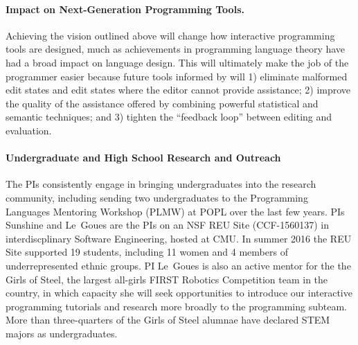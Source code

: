\paragraph{Impact on Next-Generation Programming Tools.} 
Achieving the vision outlined above will change how interactive programming tools are designed, much as achievements in programming language theory have had a broad impact on language design. This will ultimately make the job of the programmer easier because future tools informed by \HazelEnv will 1) eliminate malformed edit states and edit states where the editor cannot provide assistance; 2) improve the quality of the assistance offered by combining powerful statistical and semantic techniques; and 3) tighten the ``feedback loop'' between editing and evaluation.

\paragraph{Undergraduate and High School Research and Outreach}
%
The PIs consistently engage in bringing undergraduates into
the research community, including sending two
undergraduates to the Programming Languages Mentoring Workshop (PLMW)
at POPL over the last few years.  PIs Sunshine and Le~Goues are the PIs on an NSF REU Site
(CCF-1560137) in interdiscplinary Software Engineering, hosted at CMU.  In summer 2016 the REU Site supported 19 students, including 11 women and 4 members of
underrepresented ethnic groups.  PI Le~Goues is also an active mentor for the
the Girls of Steel, the largest all-girls FIRST Robotics
Competition team in the country, in which capacity she will
seek opportunities to introduce our interactive programming tutorials and
research more broadly to the programming subteam. More than three-quarters of the Girls of Steel
alumnae have declared STEM majors as undergraduates.

